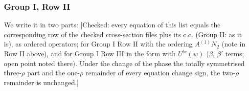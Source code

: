 \documentclass[9pt]{article}
\numberwithin{equation}{section}
\begin{document}
\subsubsection{Group I, Row II}
We write it in two parts: {\color{red}[Checked: every equation of this list equals the corresponding row of the checked cross-section files plus its c.c. (Group II: as it is), as ordered operators; for Group I Row II with the ordering $A^{(1)}N_{2}$ (note in Row II above), and for Group I Row III in the form with $U^{bc}(w)$ ($\beta$, $\beta'$ terms; open point noted there). Under the change of the phase the totally symmetrised three-$\rho$ part and the one-$\rho$ remainder of every equation change sign, the two-$\rho$ remainder is unchanged.]}
\end{document}
